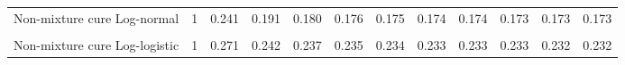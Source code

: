 \documentclass[
]{article}
\begin{document}
\begin{table}[H]
{\begin{tabular}[t]{lrrrrrrrrrrr}
Non-mixture cure Log-normal & 1 & 0.241 & 0.191 & 0.180 & 0.176 & 0.175 & 0.174 & 0.174 & 0.173 & 0.173 & 0.173\\
\cellcolor{gray!10}{Mixture cure Log-logistic} & \cellcolor{gray!10}{1} & \cellcolor{gray!10}{0.261} & \cellcolor{gray!10}{0.229} & \cellcolor{gray!10}{0.223} & \cellcolor{gray!10}{0.221} & \cellcolor{gray!10}{0.219} & \cellcolor{gray!10}{0.219} & \cellcolor{gray!10}{0.219} & \cellcolor{gray!10}{0.218} & \cellcolor{gray!10}{0.218} & \cellcolor{gray!10}{0.218}\\
Non-mixture cure Log-logistic & 1 & 0.271 & 0.242 & 0.237 & 0.235 & 0.234 & 0.233 & 0.233 & 0.233 & 0.232 & 0.232\\
\bottomrule
\end{tabular}}
\end{table}
\end{document}
